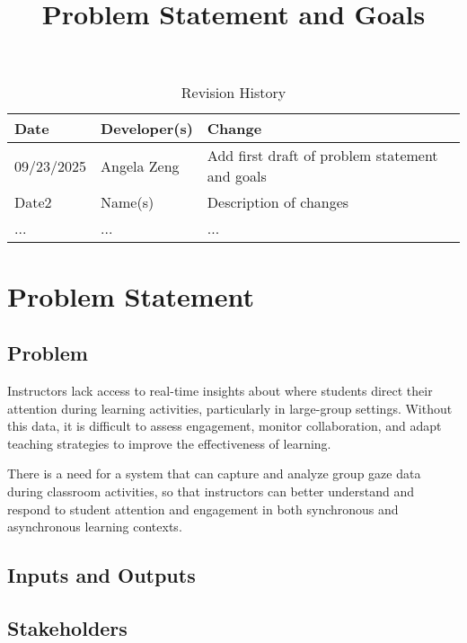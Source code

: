 \documentclass{article}
\title{Problem Statement and Goals\\\progname}
\author{\authname}
\date{}
\begin{document}
\maketitle

\begin{table}[hp]
\caption{Revision History} \label{TblRevisionHistory}
\begin{tabularx}{\textwidth}{llX}
\toprule
\textbf{Date} & \textbf{Developer(s)} & \textbf{Change}\\
\midrule
09/23/2025 & Angela Zeng & Add first draft of problem statement and goals\\
Date2 & Name(s) & Description of changes\\
... & ... & ...\\
\bottomrule
\end{tabularx}
\end{table}

\section{Problem Statement}

\subsection{Problem}

Instructors lack access to real-time insights about where students direct their 
attention during learning activities, particularly in large-group settings. Without 
this data, it is difficult to assess engagement, monitor collaboration, and adapt 
teaching strategies to improve the effectiveness of learning. 

There is a need for a system that can capture and analyze group gaze data during 
classroom activities, so that instructors can better understand and respond to 
student attention and engagement in both synchronous and asynchronous 
learning contexts.

\subsection{Inputs and Outputs}


\subsection{Stakeholders}
\end{document}
